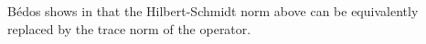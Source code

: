 \documentclass[article]{amsart}
\newtheorem{theorem}            {Theorem}[section]
\newtheorem{definition}[theorem]{Definition}
\begin{document}
Bédos shows in \cite{MR1458766} that the Hilbert-Schmidt norm above can be equivalently replaced by the trace norm of the operator.\\
\end{document}
